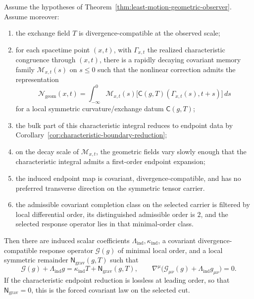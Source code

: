 \begin{theorem}
\label{thm:characteristic-covariant-geometric-reduction}
Assume the hypotheses of
Theorem~\ref{thm:least-motion-geometric-observer}. Assume moreover:
\begin{enumerate}[label=(\roman*),itemsep=0.2em]
\item the exchange field \(T\) is divergence-compatible at the observed scale;
\item for each spacetime point \((x,t)\), with \(\Gamma_{x,t}\) the realized
      characteristic congruence through \((x,t)\), there is a rapidly decaying
      covariant memory family \(\mathcal M_{x,t}(s)\) on \(s\le 0\) such that
      the nonlinear correction admits the representation
      \[
      \mathcal N_{\mathrm{geom}}(x,t)
      =
      \int_{-\infty}^0
      \mathcal M_{x,t}(s)\bigl[
      \mathsf C(g,T)(\Gamma_{x,t}(s),t+s)
      \bigr]\,ds
      \]
      for a local symmetric curvature/exchange datum \(\mathsf C(g,T)\);
\item the bulk part of this characteristic integral reduces to endpoint data by
      Corollary~\ref{cor:characteristic-boundary-reduction};
\item on the decay scale of \(\mathcal M_{x,t}\), the geometric fields vary
      slowly enough that the characteristic integral admits a first-order
      endpoint expansion;
\item the induced endpoint map is covariant, divergence-compatible, and has no
      preferred transverse direction on the symmetric tensor carrier.
\item the admissible covariant completion class on the selected carrier is
      filtered by local differential order, its distinguished admissible order
      is \(2\), and the selected response operator lies in that minimal-order
      class.
\end{enumerate}
Then there are induced scalar coefficients
\(\Lambda_{\mathrm{ind}},\kappa_{\mathrm{ind}}\), a covariant
divergence-compatible response operator \(\mathcal G(g)\) of minimal local
order, and a local symmetric remainder \(\mathsf N_{\mathrm{grav}}(g,T)\) such
that
\[
\mathcal G(g)+\Lambda_{\mathrm{ind}}g
=
\kappa_{\mathrm{ind}}T+\mathsf N_{\mathrm{grav}}(g,T),
\qquad
\nabla^\mu\bigl(\mathcal G_{\mu\nu}(g)+\Lambda_{\mathrm{ind}}g_{\mu\nu}\bigr)=0.
\]
If the characteristic endpoint reduction is lossless at leading order, so that
\(\mathsf N_{\mathrm{grav}}=0\), this is the forced covariant law on the
selected cut.
\end{theorem}

